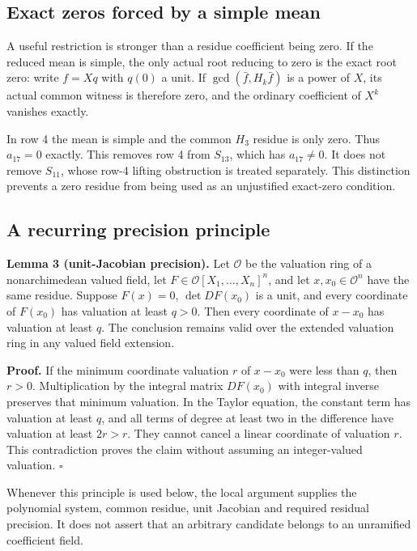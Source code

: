 \documentclass[
  british,
  10pt,
  a4paper,
]{article}
\begin{document}
\subsection{Exact zeros forced by a simple
mean}\label{exact-zeros-forced-by-a-simple-mean}

A useful restriction is stronger than a residue coefficient being zero.
If the reduced mean is simple, the only actual root reducing to zero is
the exact root zero: write \(f=Xq\) with \(q(0)\) a unit. If
\(\gcd(\bar f,H_k\bar f)\) is a power of \(X\), its actual common
witness is therefore zero, and the ordinary coefficient of \(X^k\)
vanishes exactly.

In row 4 the mean is simple and the common \(H_3\) residue is only zero.
Thus \(a_{17}=0\) exactly. This removes row 4 from \(S_{13}\), which has
\(a_{17}\ne0\). It does not remove \(S_{11}\), whose row-4 lifting
obstruction is treated separately. This distinction prevents a zero
residue from being used as an unjustified exact-zero condition.

\subsection{A recurring precision
principle}\label{a-recurring-precision-principle}

\textbf{Lemma 3 (unit-Jacobian precision).} Let \(\mathcal O\) be the
valuation ring of a nonarchimedean valued field, let
\(F\in\mathcal O[X_1,\ldots,X_n]^n\), and let \(x,x_0\in\mathcal O^n\)
have the same residue. Suppose \(F(x)=0\), \(\det DF(x_0)\) is a unit,
and every coordinate of \(F(x_0)\) has valuation at least \(q>0\). Then
every coordinate of \(x-x_0\) has valuation at least \(q\). The
conclusion remains valid over the extended valuation ring in any valued
field extension.

\textbf{Proof.} If the minimum coordinate valuation \(r\) of \(x-x_0\)
were less than \(q\), then \(r>0\). Multiplication by the integral
matrix \(DF(x_0)\) with integral inverse preserves that minimum
valuation. In the Taylor equation, the constant term has valuation at
least \(q\), and all terms of degree at least two in the difference have
valuation at least \(2r>r\). They cannot cancel a linear coordinate of
valuation \(r\). This contradiction proves the claim without assuming an
integer-valued valuation. \(\square\)

Whenever this principle is used below, the local argument supplies the
polynomial system, common residue, unit Jacobian and required residual
precision. It does not assert that an arbitrary candidate belongs to an
unramified coefficient field.
\end{document}
